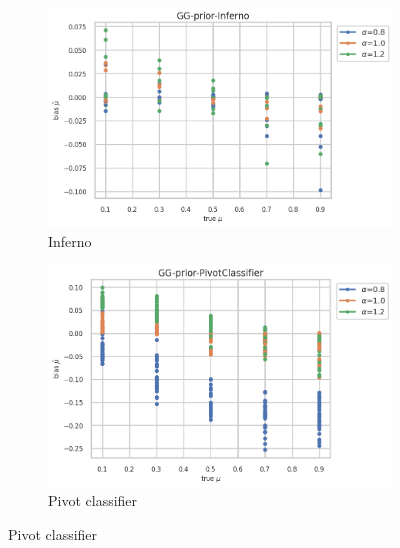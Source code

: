\begin{figure}[ht!]
  \begin{subfigure}[t]{0.49\linewidth}
    \includegraphics[width=\linewidth]{COMPARE/GG-prior/Inferno/profusion_true_mu_target_bias.png}
    \caption{Inferno}
  \end{subfigure}%
  \hfill
  \begin{subfigure}[t]{0.49\linewidth}
    \includegraphics[width=\linewidth]{COMPARE/GG-prior/PivotClassifier/profusion_true_mu_target_bias.png}
    \caption{Pivot classifier}
  \end{subfigure}


\end{figure}
